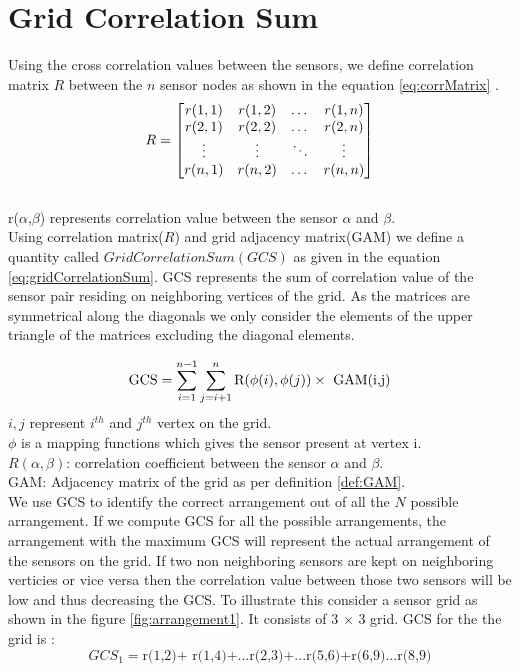 \section{Grid Correlation Sum}
\label{sec:gcs}
Using the cross correlation values between the sensors, we define correlation matrix $R$ between the $n$ sensor nodes as shown in the equation \ref{eq:corrMatrix} .
\begin{equation}
\label{eq:corrMatrix}
\centering
R = 
\begin{bmatrix}
    r(1,1) & r(1,2) & \dots  & r(1,n) \\
    r(2,1) & r(2,2)  & \dots  & r(2,n) \\
    \vdots & \vdots  & \ddots & \vdots \\
    r(n,1) & r(n,2)  & \dots  & r(n,n)
\end{bmatrix}
\end{equation}\\
r($\alpha$,$\beta$) represents correlation value between the sensor $\alpha$ and $\beta$.\\

Using correlation matrix($R$) and grid adjacency matrix(GAM) we define a quantity called ${Grid Correlation Sum (GCS)}$ as given in the equation \ref{eq:gridCorrelationSum}. GCS represents the sum of correlation value of the sensor pair residing on neighboring vertices of the grid.
As the matrices are symmetrical along the diagonals we only consider the elements of the upper triangle of the matrices excluding the diagonal elements. 

\begin{equation}
\centering
\text{GCS}=\sum_{i=1}^{n-1}\sum_{j=i+1}^{n}\text{R}(\phi(i),\phi(j))  \times \text{ GAM(i,j)}
\label{eq:gridCorrelationSum}
\end{equation}
$i,j$ represent $ i^{th}$ and $ j^{th}$ vertex on the grid.\\
$\phi$ is a mapping functions which gives the sensor present at vertex i.\\
$R(\alpha,\beta)$: correlation coefficient between the sensor $\alpha$ and $\beta$.\\
GAM:  Adjacency matrix of the grid as per definition \ref{def:GAM}.\\

We use GCS to identify the correct arrangement out of all the $N$ possible arrangement. If we compute  GCS for all the possible arrangements, the arrangement with the maximum GCS will represent the actual arrangement of the sensors on the grid.  
If two non neighboring sensors are kept on neighboring verticies or vice versa then the correlation value between those two sensors will be low and thus decreasing the GCS.
To illustrate this consider a sensor grid as shown in the figure \ref{fig:arrangement1}.
 It consists of 3 $\times$ 3 grid.  
GCS for the  the grid is :\\
\begin{equation*}
GCS_{1}=\text{r(1,2)+ r(1,4)+...r(2,3)+...r(5,6)+r(6,9)...r(8,9)}
\end{equation*}

